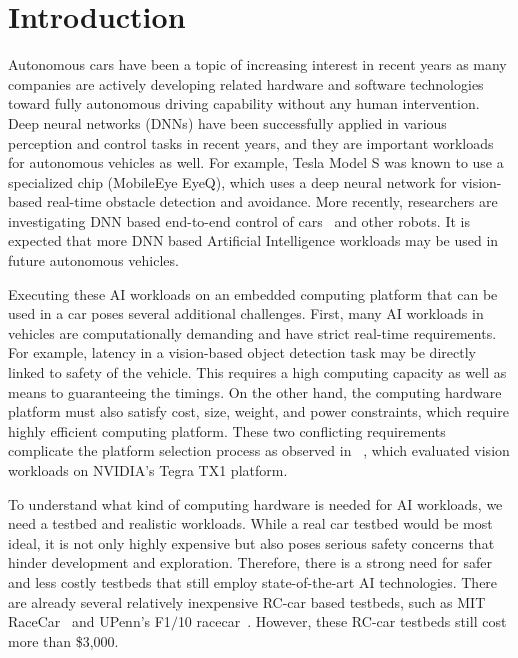 \section{Introduction} \label{sec:intro}

%
%
Autonomous cars have been a topic of increasing interest in recent
years as many companies are actively developing related hardware
and software technologies toward fully autonomous driving capability without
any human intervention. Deep neural networks (DNNs) have been
successfully applied in various perception and control tasks in
recent years, and they are important workloads for autonomous vehicles
as well. For example, Tesla Model S was known to use a specialized
chip (MobileEye EyeQ), which uses a deep neural network for vision-based
real-time obstacle detection and avoidance. More recently, researchers
are investigating DNN based end-to-end control of
cars~\cite{Bojarski2016} and other robots. It is expected that more
DNN based Artificial Intelligence workloads may be used in future
autonomous vehicles.

Executing these AI workloads on an embedded computing platform that can
be used in a car poses several additional challenges. First, many AI
workloads in vehicles are computationally demanding and have strict
real-time requirements. For example, latency in a vision-based object
detection task may be directly linked to safety of the vehicle. This
requires a high computing capacity as well as means to guaranteeing
the timings. On the other hand, the computing hardware platform must
also satisfy cost, size, weight, and power constraints, which require
highly efficient computing platform. These two conflicting
requirements  complicate the platform selection process as observed in
~\cite{Otterness2017}, which evaluated vision workloads on
NVIDIA's Tegra TX1 platform.


To understand what kind of computing hardware is needed for AI
workloads, we need a testbed and realistic workloads. While a real car
testbed would be most ideal, it is not only highly expensive but also
poses serious safety concerns that hinder development and exploration.
Therefore, there is a strong need for safer and less costly testbeds
that still employ state-of-the-art AI technologies. There are already
several relatively inexpensive RC-car based testbeds, such as MIT
RaceCar~\cite{shin2017project} and UPenn's F1$/$10 racecar~\cite{upennf1tenth}.
However, these RC-car testbeds still cost more than \$3,000.

